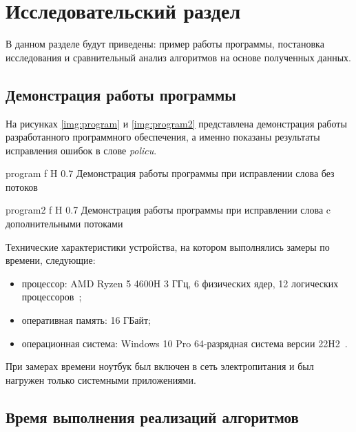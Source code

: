 \chapter{Исследовательский раздел}

В данном разделе будут приведены: пример работы программы, постановка исследования и сравнительный анализ алгоритмов на основе полученных данных.

\section{Демонстрация работы программы}


На рисунках \ref{img:program} и \ref{img:program2} представлена демонстрация работы разработанного программного обеспечения, а именно показаны результаты исправления ошибок в слове \textit{policu}.  

{program} %
{f} %
{H} %
{0.7\textwidth} %
{Демонстрация работы программы при исправлении слова без потоков} %

{program2} %
{f} %
{H} %
{0.7\textwidth} %
{Демонстрация работы программы при исправлении слова c дополнительными потоками} %


Технические характеристики устройства, на котором выполнялись замеры по времени, следующие:
\begin{itemize}
	\item процессор: AMD Ryzen 5 4600H 3 ГГц, 6 физических ядер, 12 логических процессоров~\cite{amd};
	\item оперативная память: 16 ГБайт;
	\item операционная система: Windows 10 Pro 64-разрядная система версии 22H2~\cite{windows}.
\end{itemize}

При замерах времени ноутбук был включен в сеть электропитания и был нагружен только системными приложениями.

\section{Время выполнения реализаций алгоритмов}

